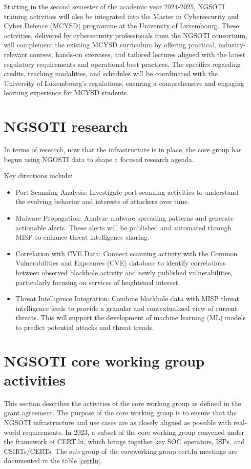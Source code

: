 Starting in the second semester of the academic year 2024-2025, NGSOTI
training activities will also be integrated into the Master in
Cybersecurity and Cyber Defence (MCYSD) programme at the University of
Luxembourg. These activities, delivered by cybersecurity professionals
from the NGSOTI consortium, will complement the existing MCYSD
curriculum by offering practical, industry-relevant courses, hands-on
exercises, and tailored lectures aligned with the latest regulatory
requirements and operational best practices. The specifics regarding
credits, teaching modalities, and schedules will be coordinated with the
University of Luxembourg's regulations, ensuring a comprehensive and
engaging learning experience for MCYSD students.


\chapter{NGSOTI research}
In terms of research, now that the infrastructure is in place, the core group
has begun using NGOSTI data to shape a focused research agenda.

Key directions include:

\begin{itemize}
 \item Port Scanning Analysis: Investigate port scanning activities to
 understand the evolving behavior and interests of attackers over time.
 \item Malware Propagation: Analyze malware spreading patterns and
 generate actionable alerts. These alerts will be published and automated
 through MISP to enhance threat intelligence sharing.
 \item Correlation with CVE Data: Connect scanning activity with the
 Common Vulnerabilities and Exposures (CVE) database to identify
 correlations between observed blackhole activity and newly published
 vulnerabilities, particularly focusing on services of heightened interest.
 \item Threat Intelligence Integration: Combine blackhole data with MISP
 threat intelligence feeds to provide a granular and contextualized view
 of current threats. This will support the development of machine
 learning (ML) models to predict potential attacks and threat trends.
 \end{itemize}


\chapter{NGSOTI core working group activities}
This section describes the activities of the core working group as defined in the grant agreement. The purpose of the core working group is to ensure that the NGSOTI infrastructure and use cases are as closely aligned as possible with real-world requirements. In 2023, a subset of the core working group convened under the framework of CERT.lu, which brings together key SOC operators, ISPs, and CSIRTs/CERTs.
The sub group of the coreworking group cert.lu meetings are documented in the table \ref{certlu}.

